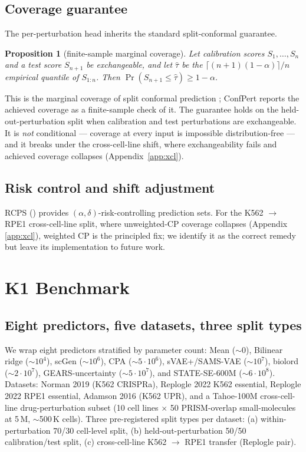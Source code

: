 \documentclass{article}
\newtheorem{proposition}{Proposition}
\begin{document}
\subsection{Coverage guarantee}
The per-perturbation head inherits the standard split-conformal guarantee.

\begin{proposition}[finite-sample marginal coverage]
Let calibration scores $S_1, \dots, S_n$ and a test score $S_{n+1}$ be exchangeable, and let $\hat{\tau}$ be the $\lceil (n+1)(1-\alpha)\rceil/n$ empirical quantile of $S_{1:n}$. Then $\Pr(S_{n+1} \leq \hat{\tau}) \geq 1 - \alpha$.
\end{proposition}

This is the marginal coverage of split conformal prediction \citep{vovk2012, romano2019}; ConfPert reports the achieved coverage as a finite-sample check of it. The guarantee holds on the held-out-perturbation split when calibration and test perturbations are exchangeable. It is \emph{not} conditional --- coverage at every input is impossible distribution-free \citep{vovk2012} --- and it breaks under the cross-cell-line shift, where exchangeability fails and achieved coverage collapses (Appendix~\ref{app:xcl}).

\subsection{Risk control and shift adjustment}
RCPS (\citet{bates2021}) provides $(\alpha, \delta)$-risk-controlling prediction sets. For the K562 $\rightarrow$ RPE1 cross-cell-line split, where unweighted-CP coverage collapses (Appendix \ref{app:xcl}), \citet{tibshirani2019} weighted CP is the principled fix; we identify it as the correct remedy but leave its implementation to future work.

\section{K1 Benchmark}

\subsection{Eight predictors, five datasets, three split types}
We wrap eight predictors stratified by parameter count: Mean ($\sim 0$), Bilinear ridge ($\sim 10^4$), scGen ($\sim 10^6$), CPA ($\sim 5 \cdot 10^6$), sVAE+/SAMS-VAE ($\sim 10^7$), biolord ($\sim 2 \cdot 10^7$), GEARS-uncertainty ($\sim 5 \cdot 10^7$), and STATE-SE-600M ($\sim 6 \cdot 10^8$). Datasets: Norman 2019 (K562 CRISPRa), Replogle 2022 K562 essential, Replogle 2022 RPE1 essential, Adamson 2016 (K562 UPR), and a Tahoe-100M \citep{tahoe2025} cross-cell-line drug-perturbation subset (10 cell lines $\times$ 50 PRISM-overlap small-molecules at 5\,\textmu M, $\sim$500\,K cells). Three pre-registered split types per dataset: (a) within-perturbation 70/30 cell-level split, (b) held-out-perturbation 50/50 calibration/test split, (c) cross-cell-line K562 $\rightarrow$ RPE1 transfer (Replogle pair).
\end{document}
